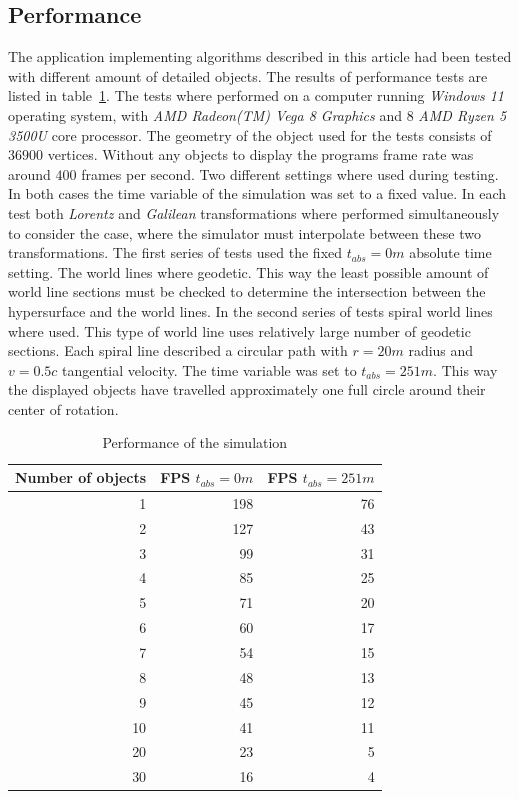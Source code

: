 \documentclass{egpubl}
\begin{document}
\subsection{Performance}
\label{sec:performance}
The application implementing algorithms described in this article had been tested with different amount of detailed objects. The results of performance tests are listed in table~\ref{tab:performance}. The tests where performed on a computer running \emph{Windows 11} operating system, with \emph{AMD Radeon(TM) Vega 8 Graphics} and 8 \emph{AMD Ryzen 5 3500U} core processor.
The geometry of the object used for the tests consists of $36900$ vertices. Without any objects to display the programs frame rate was around $400$ frames per second. Two different settings where used during testing. In both cases the time variable of the simulation was set to a fixed value. In each test both \emph{Lorentz} and \emph{Galilean} transformations where performed simultaneously to consider the case, where the simulator must interpolate between these two transformations. 
The first series of tests used the fixed $t_{abs}=0 m$ absolute time setting. The world lines where geodetic. This way the least possible amount of world line sections must be checked to determine the intersection between the hypersurface and the world lines. In the second series of tests spiral world lines where used. This type of world line uses relatively large number of geodetic sections. Each spiral line described a circular path with $r=20 m$ radius and $v=0.5 c$ tangential velocity. The time variable was set to $t_{abs}=251 m$. This way the displayed objects have travelled approximately one full circle around their center of rotation.
\begin{table}
\caption{Performance of the simulation}
\label{tab:performance}
\begin{tabular}{|r|r|r|}
\hline
Number of objects & FPS $t_{abs} = 0 m$ & FPS $t_{abs} = 251 m$\\
\hline
\hline
1&198&76\\
\hline
2&127&43\\
\hline
3&99&31\\
\hline
4&85&25\\
\hline
5&71&20\\
\hline
6&60&17\\
\hline
7&54&15\\
\hline
8&48&13\\
\hline
9&45&12\\
\hline
10&41&11\\
\hline
20&23&5\\
\hline
30&16&4\\
\hline

\end{tabular}
\end{table}
\end{document}
